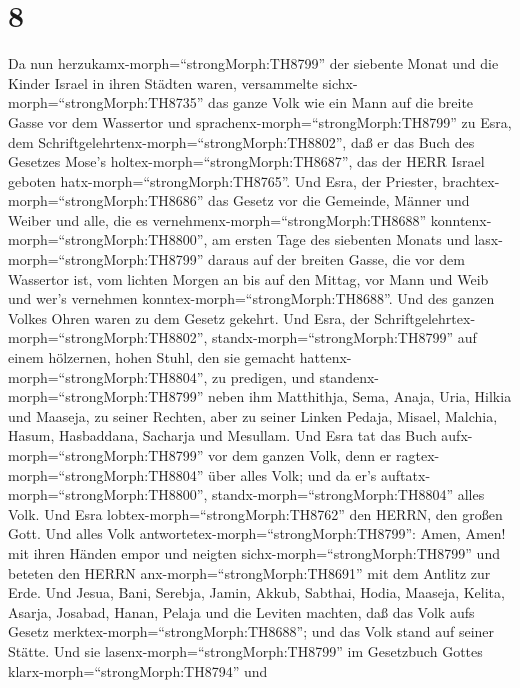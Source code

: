 \hypertarget{section-7}{%
\section{8}\label{section-7}}

 Da nun herzukamx-morph=``strongMorph:TH8799'' der siebente
Monat und die Kinder Israel in ihren Städten waren, versammelte
sichx-morph=``strongMorph:TH8735'' das ganze Volk wie ein Mann auf die
breite Gasse vor dem Wassertor und
sprachenx-morph=``strongMorph:TH8799'' zu Esra, dem
Schriftgelehrtenx-morph=``strongMorph:TH8802'', daß er das Buch des
Gesetzes Mose's holtex-morph=``strongMorph:TH8687'', das der HERR Israel
geboten hatx-morph=``strongMorph:TH8765''.  Und Esra, der
Priester, brachtex-morph=``strongMorph:TH8686'' das Gesetz vor die
Gemeinde, Männer und Weiber und alle, die es
vernehmenx-morph=``strongMorph:TH8688''
konntenx-morph=``strongMorph:TH8800'', am ersten Tage des siebenten
Monats  und lasx-morph=``strongMorph:TH8799'' daraus auf der
breiten Gasse, die vor dem Wassertor ist, vom lichten Morgen an bis auf
den Mittag, vor Mann und Weib und wer's vernehmen
konntex-morph=``strongMorph:TH8688''. Und des ganzen Volkes Ohren waren
zu dem Gesetz gekehrt.  Und Esra, der
Schriftgelehrtex-morph=``strongMorph:TH8802'',
standx-morph=``strongMorph:TH8799'' auf einem hölzernen, hohen Stuhl,
den sie gemacht hattenx-morph=``strongMorph:TH8804'', zu predigen, und
standenx-morph=``strongMorph:TH8799'' neben ihm Matthithja, Sema, Anaja,
Uria, Hilkia und Maaseja, zu seiner Rechten, aber zu seiner Linken
Pedaja, Misael, Malchia, Hasum, Hasbaddana, Sacharja und Mesullam.
 Und Esra tat das Buch aufx-morph=``strongMorph:TH8799'' vor
dem ganzen Volk, denn er ragtex-morph=``strongMorph:TH8804'' über alles
Volk; und da er's auftatx-morph=``strongMorph:TH8800'',
standx-morph=``strongMorph:TH8804'' alles Volk.  Und Esra
lobtex-morph=``strongMorph:TH8762'' den HERRN, den großen Gott. Und
alles Volk antwortetex-morph=``strongMorph:TH8799'': Amen, Amen! mit
ihren Händen empor und neigten sichx-morph=``strongMorph:TH8799'' und
beteten den HERRN anx-morph=``strongMorph:TH8691'' mit dem Antlitz zur
Erde.  Und Jesua, Bani, Serebja, Jamin, Akkub, Sabthai,
Hodia, Maaseja, Kelita, Asarja, Josabad, Hanan, Pelaja und die Leviten
machten, daß das Volk aufs Gesetz merktex-morph=``strongMorph:TH8688'';
und das Volk stand auf seiner Stätte.  Und sie
lasenx-morph=``strongMorph:TH8799'' im Gesetzbuch Gottes
klarx-morph=``strongMorph:TH8794'' und
